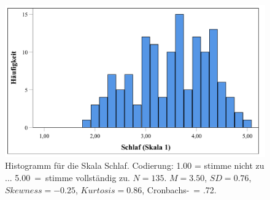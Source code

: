 \begin{figure}[htb]
    \centering
        \includegraphics[width=0.8\linewidth]{Histogramm Skala Schlaf.pdf}
        \caption[Histogramm für die Skala Schlaf]{Histogramm für die Skala Schlaf. 
        Codierung: 1.00 = stimme nicht zu ... 5.00~=~stimme vollständig zu. $N = 135$. 
        $M = 3.50$, $SD = 0.76$, $Skewness = -0.25$, $Kurtosis = 0.86$, 
        Cronbachs-\textalpha \ = .72.}
        \label{Histogramm Skala Schlaf}
\end{figure}